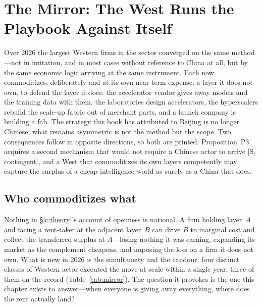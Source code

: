 \chapter{The Mirror: The West Runs the Playbook Against Itself}
\label{c:mirror}

\begin{glance}
Over 2026 the largest Western firms in the sector converged on the same method---not in imitation, and in most cases without reference to China at all, but by the same economic logic arriving at the same instrument. Each now commoditizes, deliberately and at its own near-term expense, a layer it does not own, to defend the layer it does: the accelerator vendor gives away models and the training data with them, the laboratories design accelerators, the hyperscalers rebuild the scale-up fabric out of merchant parts, and a launch company is building a fab. The strategy this book has attributed to Beijing is no longer Chinese; what remains asymmetric is not the method but the scope. Two consequences follow in opposite directions, so both are printed: Proposition~P3 acquires a second mechanism that would not require a Chinese actor to arrive [S, contingent], and a West that commoditizes its own layers competently may capture the surplus of a cheap-intelligence world as surely as a China that does. 
\end{glance}

\section{Who commoditizes what}

Nothing in \S\ref{c:theory}'s account of openness is national. A firm holding layer~$A$ and facing a rent-taker at the adjacent layer~$B$ can drive $B$ to marginal cost and collect the transferred surplus at $A$---losing nothing it was earning, expanding its market as the complement cheapens, and imposing the loss on a firm it does not own. What is new in 2026 is the simultaneity and the candour: four distinct classes of Western actor executed the move at scale within a single year, three of them on the record (Table~\ref{tab:mirror}). The question it provokes is the one this chapter exists to answer---when everyone is giving away everything, where does the rent actually land?

